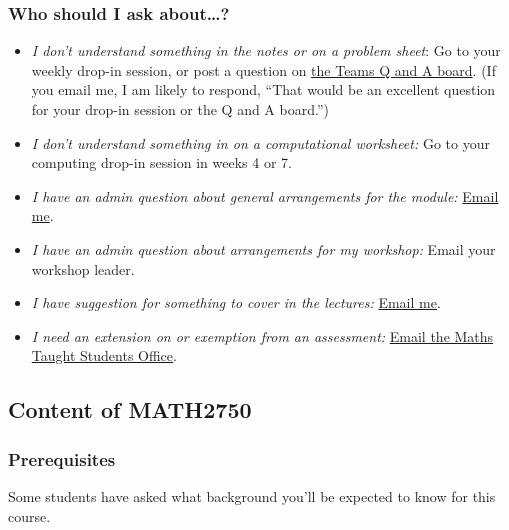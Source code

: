 \documentclass[
  a4paper,
]{article}
\providecommand{\tightlist}{%
  \setlength{\itemsep}{0pt}\setlength{\parskip}{0pt}}
\theoremstyle{definition}
\theoremstyle{definition}
\theoremstyle{definition}
\theoremstyle{remark}
\begin{document}
\hypertarget{ask}{%
\subsubsection*{Who should I ask about\ldots?}\label{ask}}

\begin{itemize}
\tightlist
\item
  \emph{I don't understand something in the notes or on a problem sheet}: Go to your weekly drop-in session, or post a question on \href{https://teams.microsoft.com/l/channel/19\%3a5fcd058b7074426ca1f7d1cf2052d3b4\%40thread.tacv2/Q\%2520and\%2520A?groupId=1c138eac-0c54-43b0-9d20-d4cf3d65c40a\&tenantId=bdeaeda8-c81d-45ce-863e-5232a535b7cb}{the Teams Q and A board}. (If you email me, I am likely to respond, ``That would be an excellent question for your drop-in session or the Q and A board.'')
\item
  \emph{I don't understand something in on a computational worksheet:} Go to your computing drop-in session in weeks 4 or 7.
\item
  \emph{I have an admin question about general arrangements for the module:} \href{mailto:m.aldridge@leeds.ac.uk}{Email me}.
\item
  \emph{I have an admin question about arrangements for my workshop:} Email your workshop leader.
\item
  \emph{I have suggestion for something to cover in the lectures:} \href{mailto:m.aldridge@leeds.ac.uk}{Email me}.
\item
  \emph{I need an extension on or exemption from an assessment:} \href{mailto:Maths.Taught.Students@leeds.ac.uk}{Email the Maths Taught Students Office}.
\end{itemize}

\hypertarget{about-content}{%
\subsection*{Content of MATH2750}\label{about-content}}

\hypertarget{prereqs}{%
\subsubsection*{Prerequisites}\label{prereqs}}

Some students have asked what background you'll be expected to know for this course.
\end{document}
